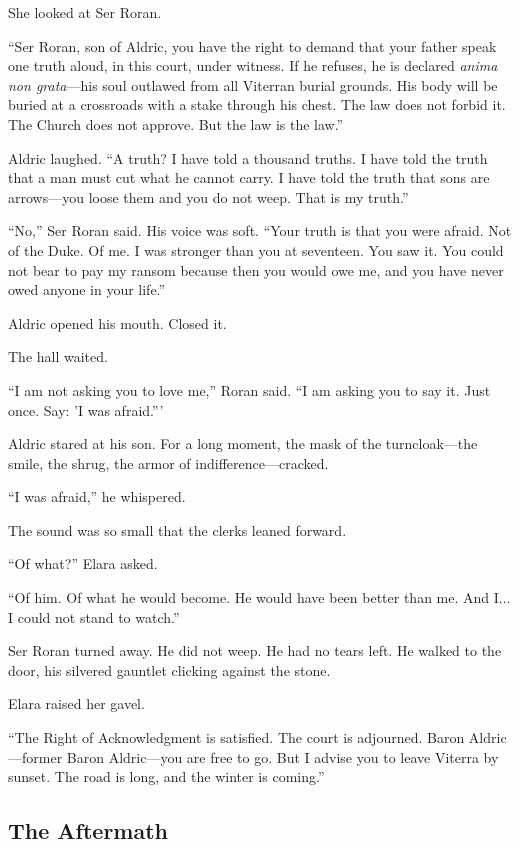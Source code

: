 \documentclass[11pt]{book}
\begin{document}
She looked at Ser Roran.

``Ser Roran, son of Aldric, you have the right to demand that your father speak one truth aloud, in this court, under witness. If he refuses, he is declared \textit{anima non grata}---his soul outlawed from all Viterran burial grounds. His body will be buried at a crossroads with a stake through his chest. The law does not forbid it. The Church does not approve. But the law is the law.''

Aldric laughed. ``A truth? I have told a thousand truths. I have told the truth that a man must cut what he cannot carry. I have told the truth that sons are arrows---you loose them and you do not weep. That is my truth.''

``No,'' Ser Roran said. His voice was soft. ``Your truth is that you were afraid. Not of the Duke. Of me. I was stronger than you at seventeen. You saw it. You could not bear to pay my ransom because then you would owe me, and you have never owed anyone in your life.''

Aldric opened his mouth. Closed it.

The hall waited.

``I am not asking you to love me,'' Roran said. ``I am asking you to say it. Just once. Say: 'I was afraid.'''

Aldric stared at his son. For a long moment, the mask of the turncloak---the smile, the shrug, the armor of indifference---cracked.

``I was afraid,'' he whispered.

The sound was so small that the clerks leaned forward.

``Of what?'' Elara asked.

``Of him. Of what he would become. He would have been better than me. And I... I could not stand to watch.''

Ser Roran turned away. He did not weep. He had no tears left. He walked to the door, his silvered gauntlet clicking against the stone.

Elara raised her gavel.

``The Right of Acknowledgment is satisfied. The court is adjourned. Baron Aldric---former Baron Aldric---you are free to go. But I advise you to leave Viterra by sunset. The road is long, and the winter is coming.''

\subsection*{The Aftermath}
\end{document}
